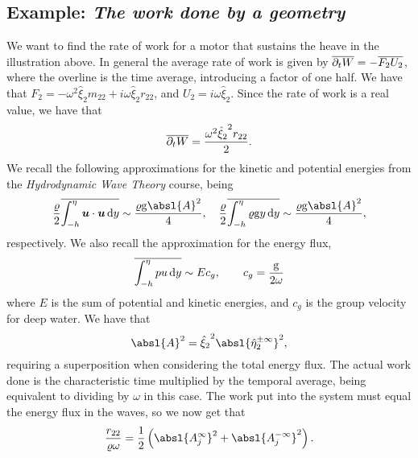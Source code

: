 \subsection{Example: \emph{The work done by a geometry}}
We want to find the rate of work for a motor that sustains the heave in the illustration above.
In general the average rate of work is given by $\overline{\partial_t W} = -\overline{F_2 U_2}$, where the overline is the time average, introducing a factor of one half.
We have that $F_2 = -\omega^2 {\hat{\xi}}_2 m_{22} + i\omega {\hat{\xi}}_2 r_{22}$, and $U_2 = i \omega {\hat{\xi}}_2$.
Since the rate of work is a real value, we have that 
\[
    \overline{\partial_t W} = \frac{\omega^2 {{}{\hat{\xi}}_{2}}^{2} r_{22}}{2}.
\]
We recall the following approximations for the kinetic and potential energies from the \emph{Hydrodynamic Wave Theory} course, being
\[
    \frac{\varrho}{2} \overline{\int_{-h}^{\eta} \uvec\cdot\uvec \,\dee y} \sim \frac{\varrho \gravity \absl{A}^2}{4}, \quad \frac{\varrho}{2} \overline{\int_{-h}^{\eta} \varrho \gravity y \,\dee y} \sim \frac{\varrho \gravity \absl{A}^2}{4},
\]
respectively.
We also recall the approximation for the energy flux,
\[
    \overline{\int_{-h}^{\eta} p u \,\mathrm{d} y} \sim E c_g, \qquad c_g = \frac{\mathrm{g}}{2\omega}
\]
where $E$ is the sum of potential and kinetic energies, and $c_g$ is the group velocity for deep water.
We have that 
\[
    {\absl{A}}^2 = {{}{\hat{\xi}}_2}^2 {\absl{{\hat{\eta}}_{2}^{\pm\infty}}}^2,
\]
requiring a superposition when considering the total energy flux.
The actual work done is the characteristic time multiplied by the temporal average, being equivalent to dividing by $\omega$ in this case.
The work put into the system must equal the energy flux in the waves, so we now get that
\[
    \frac{r_{22}}{\varrho \omega} = \frac{1}{2}\left( {\absl{A_{j}^{\infty}}}^2 + {\absl{A_{j}^{-\infty}}}^2 \right).
\]

